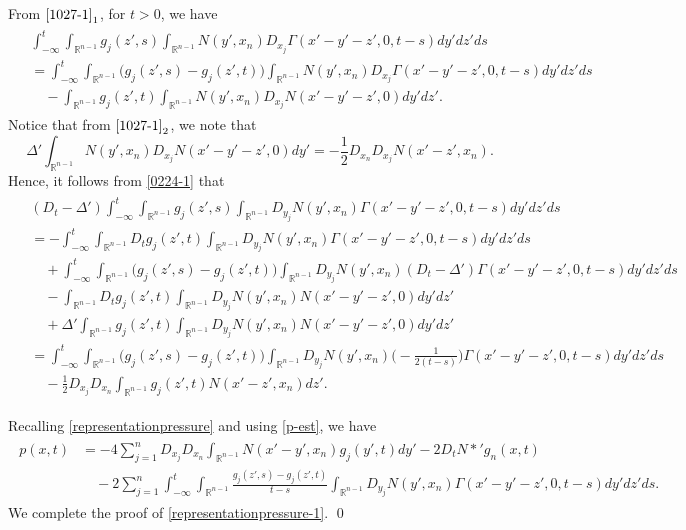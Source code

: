 \documentclass{amsart}
\numberwithin{equation}{section}
\newcommand{\Rn}{{\mathbb R}^{n-1}}
\newcommand{\De}{\Delta}
\newcommand{\Ga}{\Gamma}
\begin{document}
From $\eqref{1027-1}_1$, for $t > 0$, we have 
\begin{align}\label{0224-1}
\begin{split}
& \int_{-\infty}^t \int_{\Rn} g_j (z',s) \int_{\Rn}  N(y', x_n) D_{x_j}\Ga(x'-y' -z',0,t-s) dy' dz' ds\\
& = \int_{-\infty}^t \int_{\Rn}\big( g_j (z',s) -g_j(z',t) \big) 
  \int_{\Rn}   N(y', x_n) D_{x_j} \Ga(x'-y' -z',0,t-s) dy' dz' ds \\
&\quad -   \int_{\Rn} g_j (z',t) \int_{\Rn}  N(y', x_n)  D_{x_j} N(x'-y' -z',0) dy' dz'.
\end{split}
\end{align}
Notice that from $\eqref{1027-1}_2$, we note that
\[
\De' \int_{\Rn}   N(y', x_n) D_{x_j} N(x'-y' -z',0) dy' = -\frac12 D_{x_n} D_{x_j} N(x'-z', x_n).
\]
Hence, it follows from \eqref{0224-1} that
\begin{align}\label{p-est}
\begin{split}
& (D_t -\De') \int_{-\infty}^t \int_{\Rn} g_j (z',s) \int_{\Rn} D_{y_j} N(y', x_n) \Ga(x'-y' -z',0,t-s) dy' dz' ds\\
& = - \int_{-\infty}^t \int_{\Rn} D_t g_j(z',t) \int_{\Rn} D_{y_j} N(y', x_n) \Ga(x'-y' -z',0,t-s) dy' dz' ds \\
&\quad + \int_{-\infty}^t \int_{\Rn}\big( g_j (z',s) -g_j(z',t) \big) 
  \int_{\Rn} D_{y_j} N(y', x_n) (D_t -\De') \Ga(x'-y' -z',0,t-s) dy' dz' ds \\
&\quad - \int_{\Rn} D_t g_j (z',t) \int_{\Rn} D_{y_j} N(y', x_n) N(x'-y' -z',0) dy' dz'\\
&\quad + \De' \int_{\Rn} g_j (z',t) \int_{\Rn} D_{y_j} N(y', x_n) N(x'-y' -z',0) dy' dz'\\
& = \int_{-\infty}^t \int_{\Rn}\big( g_j (z',s) -g_j(z',t) \big) 
  \int_{\Rn} D_{y_j} N(y', x_n) \Big(-\frac{1}{2(t -s)}\Big) \Ga(x'-y' -z',0,t-s) dy' dz' ds \\
&\quad -  \frac12 D_{x_j} D_{x_n} \int_{\Rn} g_j (z',t) N(x' -z',x_n) dz'.
\end{split}
\end{align}

Recalling \eqref{representationpressure} and using \eqref{p-est}, we have
 \begin{align*}%
\begin{split}
p(x,t) 
& = -4 \sum_{j =1}^{n} D_{x_j} D_{x_n} \int_{\Rn} N(x' -y', x_n) g_j(y', t) dy' - 2 D_t N*' g_n (x,t) \\
& \quad - 2\sum_{j =1}^{n} \int_{-\infty}^t \int_{\Rn}\frac{g_j (z',s) -g_j(z',t)}{t -s} 
  \int_{\Rn} D_{y_j} N(y', x_n) \Ga(x'-y' -z',0,t-s) dy' dz' ds. 
\end{split}
\end{align*}
We complete the proof of \eqref{representationpressure-1}.
\qed 
 
\end{document}
